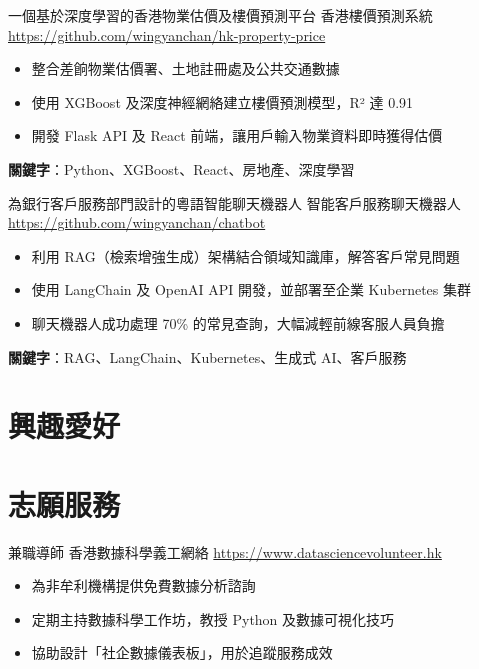\documentclass[a4paper, serif, 10pt]{moderncv}
\begin{document}
        {一個基於深度學習的香港物業估價及樓價預測平台}
        {香港樓價預測系統}
        {\url{https://github.com/wingyanchan/hk-property-price}}
        {}
        {\begin{itemize}
\item 整合差餉物業估價署、土地註冊處及公共交通數據
\item 使用 XGBoost 及深度神經網絡建立樓價預測模型，R² 達 0.91
\item 開發 Flask API 及 React 前端，讓用戶輸入物業資料即時獲得估價
\end{itemize}
\textbf{關鍵字}：Python、XGBoost、React、房地產、深度學習}

        {為銀行客戶服務部門設計的粵語智能聊天機器人}
        {智能客戶服務聊天機器人}
        {\url{https://github.com/wingyanchan/chatbot}}
        {}
        {\begin{itemize}
\item 利用 RAG（檢索增強生成）架構結合領域知識庫，解答客戶常見問題
\item 使用 LangChain 及 OpenAI API 開發，並部署至企業 Kubernetes 集群
\item 聊天機器人成功處理 70\% 的常見查詢，大幅減輕前線客服人員負擔
\end{itemize}
\textbf{關鍵字}：RAG、LangChain、Kubernetes、生成式 AI、客戶服務}
\section{興趣愛好}

\section{志願服務}

        {兼職導師}
        {香港數據科學義工網絡}
        {\url{https://www.datasciencevolunteer.hk}}
        {}
        {\begin{itemize}
\item 為非牟利機構提供免費數據分析諮詢
\item 定期主持數據科學工作坊，教授 Python 及數據可視化技巧
\item 協助設計「社企數據儀表板」，用於追蹤服務成效
\end{itemize}}
\end{document}
